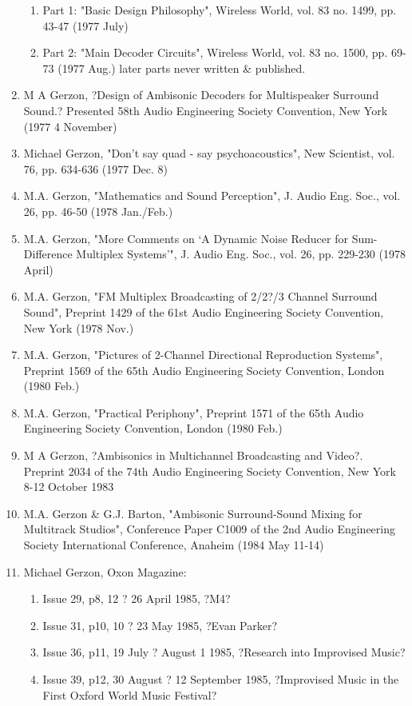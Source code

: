 \documentclass[9pt]{amsart}
\begin{document}
\begin{enumerate}
	\begin{enumerate}
	\item Part 1: "Basic Design Philosophy", Wireless World, vol. 83 no. 1499, pp. 43-47 (1977 July)
	\item Part 2: "Main Decoder Circuits", Wireless World, vol. 83 no. 1500, pp. 69-73 (1977 Aug.) later parts never written \& published.
	\end{enumerate}
\item M A Gerzon, ?Design of Ambisonic Decoders for Multispeaker Surround Sound.? Presented 58th Audio Engineering Society Convention, New York (1977 4 November)
\item Michael Gerzon, "Don't say quad - say psychoacoustics", New Scientist, vol. 76, pp. 634-636 (1977 Dec. 8)
\item M.A. Gerzon, "Mathematics and Sound Perception", J. Audio Eng. Soc., vol. 26, pp. 46-50 (1978 Jan./Feb.)
\item M.A. Gerzon, "More Comments on `A Dynamic Noise Reducer for Sum-Difference Multiplex Systems'", J. Audio Eng. Soc., vol. 26, pp. 229-230 (1978 April)
\item M.A. Gerzon, "FM Multiplex Broadcasting of 2/2?/3 Channel Surround Sound", Preprint 1429 of the 61st Audio Engineering Society Convention, New York (1978 Nov.)
\item M.A. Gerzon, "Pictures of 2-Channel Directional Reproduction Systems", Preprint 1569 of the 65th Audio Engineering Society Convention, London (1980 Feb.)
\item M.A. Gerzon, "Practical Periphony", Preprint 1571 of the 65th Audio Engineering Society Convention, London (1980 Feb.)
\item M A Gerzon, ?Ambisonics in Multichannel Broadcasting and Video?. Preprint 2034 of the 74th Audio Engineering Society Convention, New York 8-12 October 1983
\item M.A. Gerzon \& G.J. Barton, "Ambisonic Surround-Sound Mixing for Multitrack Studios", Conference Paper C1009 of the 2nd Audio Engineering Society International Conference, Anaheim (1984 May 11-14)
\item Michael Gerzon, Oxon Magazine: 
	\begin{enumerate}
	\item Issue 29, p8, 12 ? 26 April 1985, ?M4?
	\item Issue 31, p10, 10 ? 23 May 1985, ?Evan Parker?
	\item Issue 36, p11, 19 July ? August 1 1985, ?Research into Improvised Music?
	\item Issue 39, p12, 30 August ? 12 September 1985, ?Improvised Music in the First Oxford World Music Festival?

\end{enumerate}
\end{enumerate}
\end{document}

